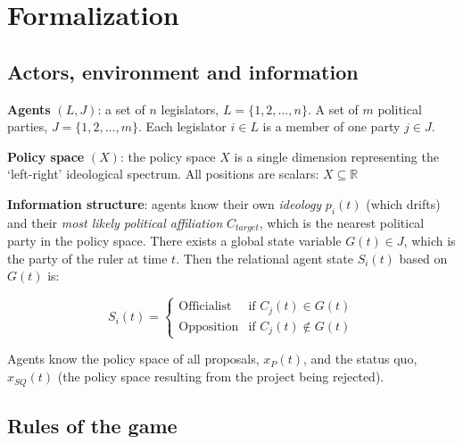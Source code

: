 \documentclass{article}
\begin{document}
	
	\section{Formalization}
	
	\subsection{Actors, environment and information}
	
	\textbf{Agents} $(L, J)$: a set of $n$ legislators, $L = \{1, 2, \dots, n\}$. A set of $m$ political parties, $J = \{1, 2, \dots, m\}$. Each legislator $i \in L$ is a member of one party $j \in J$.
	
	\textbf{Policy space} $(X)$: the policy space $X$ is a single dimension representing the `left-right' ideological spectrum. All positions are scalars: $X \subseteq \mathbb{R}$
	
	\textbf{Information structure}: agents know their own \textit{ideology} $p_{i}(t)$ (which drifts) and their \textit{most likely political affiliation} $C_{target}$, which is the nearest political party in the policy space. There exists a global state variable $G(t) \in J$, which is the party of the ruler at time $t$. Then the relational agent state $S_{i}(t)$ based on $G(t)$ is:
	
	\begin{equation}\label{relational_state}
		S_{i}(t) = \begin{cases}
			\text{Officialist} & \text{if } C_{j}(t) \in G(t) \\
			\text{Opposition} & \text{if } C_{j}(t) \notin G(t)
		\end{cases}
	\end{equation}
	
	Agents know the policy space of all proposals, $x_{P}(t)$, and the status quo, $x_{SQ}(t)$ (the policy space resulting from the project being rejected).
	
	\subsection{Rules of the game}
	
\end{document}
